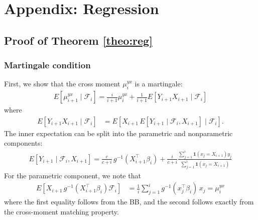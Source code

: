\documentclass[11pt,a4paper]{article}
\theoremstyle{plain}
\theoremstyle{remark}
\theoremstyle{remark}
\begin{document}
\section{Appendix: Regression}\label{sec:app_reg}
            \subsection{Proof of Theorem \ref{theo:reg}}\label{sec:app_proofreg}
            \subsubsection{Martingale condition}
First, we show that the cross moment $\mu_i^{yx}$ is a martingale:
\begin{align*}
E[\mu^{yx}_{i+1} \mid \mathcal{F}_i]
= \frac{i}{i+1}\mu_{i}^{yx} + \frac{1}{i+1}E\left[ Y_{i+1} X_{i+1} \mid \mathcal{F}_i\right]
\end{align*}
where
\begin{align*}
    E[ Y_{i+1} X_{i+1}\mid \mathcal{F}_i]&\nonumber= E[X_{i+1} \, E[ Y_{i+1} \mid \mathcal{F}_i, X_{i+1}]\mid \mathcal{F}_i].
\end{align*}
The inner expectation can be split into the parametric and nonparametric components:
\begin{align*}
    E[ Y_{i+1} \mid \mathcal{F}_i, X_{i+1}] = \frac{c}{c+i}\, g^{-1}\left(X^\top _{i+1}\beta_i\right) + \frac{i}{c+i} \frac{\sum_{j = 1}^i \mathbf{1}\left(x_j = X_{i+1} \right) y_j}{\sum_{j = 1}^i \mathbf{1}\left(x_j = X_{i+1}\right)} 
\end{align*}
For the parametric component, we note that
\begin{align*}
    E\left[X_{i+1} \,g^{-1}\left(X_{i+1}^\top \beta_i\right) \mathcal{F}_i\right]&=  \frac{1}{i}\sum_{j= 1}^i g^{-1}\left(x_j^\top \beta_i \right) \, x_j = \mu_i^{yx}
\end{align*}
where the first equality follows from the BB, and the second follows exactly from the cross-moment matching property.
\end{document}
